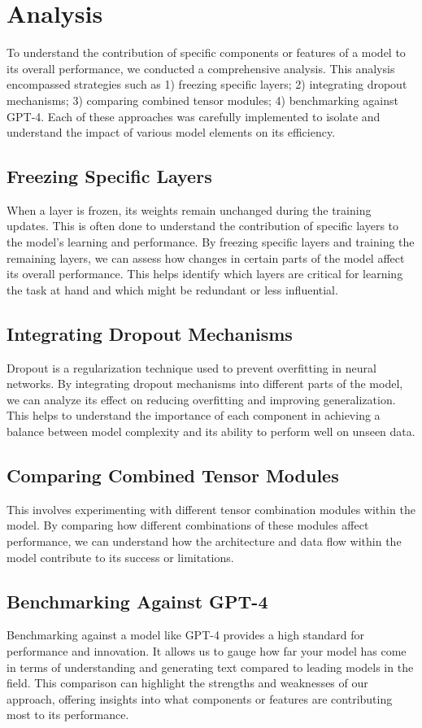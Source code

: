 \section{Analysis}
\label{sec:4_analysis}
To understand the contribution of specific components or features of a model to its overall performance, we conducted a comprehensive analysis. This analysis encompassed strategies such as 1) freezing specific layers; 2) integrating dropout mechanisms; 3) comparing combined tensor modules; 4) benchmarking against GPT-4. Each of these approaches was carefully implemented to isolate and understand the impact of various model elements on its efficiency.

\subsection{Freezing Specific Layers}
\label{subsec:4_freezing_specific_layers}
When a layer is frozen, its weights remain unchanged during the training updates. This is often done to understand the contribution of specific layers to the model's learning and performance. By freezing specific layers and training the remaining layers, we can assess how changes in certain parts of the model affect its overall performance. This helps identify which layers are critical for learning the task at hand and which might be redundant or less influential.
\subsection{Integrating Dropout Mechanisms}
\label{subsec:4_integrating_dropout_mechanisms} 
Dropout is a regularization technique used to prevent overfitting in neural networks. By integrating dropout mechanisms into different parts of the model, we can analyze its effect on reducing overfitting and improving generalization. This helps to understand the importance of each component in achieving a balance between model complexity and its ability to perform well on unseen data.
\subsection{Comparing Combined Tensor Modules}
\label{subsec:4_comparing_combined_tensor_modules}
This involves experimenting with different tensor combination modules within the model. By comparing how different combinations of these modules affect performance, we can understand how the architecture and data flow within the model contribute to its success or limitations.
\subsection{Benchmarking Against GPT-4}
\label{subsec:4_benchmarking_against_gpt-4}
Benchmarking against a model like GPT-4 provides a high standard for performance and innovation. It allows us to gauge how far your model has come in terms of understanding and generating text compared to leading models in the field. This comparison can highlight the strengths and weaknesses of our approach, offering insights into what components or features are contributing most to its performance. 